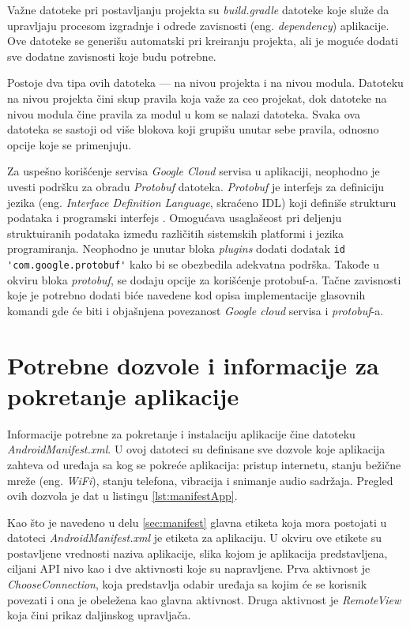 \documentclass[implementacija.tex]{subfiles}
\begin{document}
Važne datoteke pri postavljanju projekta su \textit{build.gradle} datoteke koje služe da  upravljaju procesom izgradnje i odrede zavisnosti (eng. \textit{dependency}) aplikacije. Ove datoteke se generišu automatski pri kreiranju projekta, ali je moguće dodati sve dodatne zavisnosti koje budu potrebne.

Postoje dva tipa ovih datoteka --- na nivou projekta i na nivou modula. Datoteku na nivou projekta čini skup pravila koja važe za ceo projekat, dok datoteke na nivou modula čine pravila za modul u kom se nalazi datoteka. Svaka ova datoteka se sastoji od više blokova koji grupišu unutar sebe pravila, odnosno opcije koje se primenjuju.

Za uspešno korišćenje servisa \textit{Google Cloud} servisa u aplikaciji, neophodno je uvesti podršku za obradu \textit{Protobuf} datoteka. \textit{Protobuf} je interfejs za definiciju jezika (eng. \textit{Interface Definition Language}, skraćeno IDL) koji definiše strukturu podataka i programski interfejs \cite{sajt:protobuf}. Omogućava usaglašeost pri deljenju struktuiranih podataka između različitih sistemskih platformi i jezika programiranja. Neophodno je unutar bloka \textit{plugins} dodati dodatak \verb|id 'com.google.protobuf'| kako bi se obezbedila adekvatna podrška. Takođe u okviru bloka \textit{protobuf}, se dodaju opcije za korišćenje protobuf-a. Tačne zavisnosti koje je potrebno dodati biće navedene kod opisa implementacije glasovnih komandi gde će biti i objašnjena povezanost \textit{Google cloud} servisa i \textit{protobuf}-a.

\section{Potrebne dozvole i informacije za pokretanje aplikacije}

Informacije potrebne za pokretanje i instalaciju aplikacije čine datoteku \textit{AndroidManifest.xml}. U ovoj datoteci su definisane sve dozvole koje aplikacija zahteva od uređaja sa kog se pokreće aplikacija: pristup internetu, stanju bežične mreže (eng. \textit{WiFi}), stanju telefona, vibracija i  snimanje audio sadržaja. Pregled ovih dozvola je dat u listingu \ref{lst:manifestApp}.

Kao što je navedeno u delu \ref{sec:manifest} glavna etiketa koja mora postojati u datoteci \textit{AndroidManifest.xml} je etiketa za aplikaciju. U okviru ove etikete su postavljene vrednosti naziva aplikacije, slika kojom je aplikacija predstavljena, ciljani API nivo kao i dve aktivnosti koje su napravljene. Prva aktivnost je \textit{ChooseConnection}, koja predstavlja odabir uređaja sa kojim će se korisnik povezati i ona je obeležena kao glavna aktivnost. Druga aktivnost je \textit{RemoteView} koja čini prikaz daljinskog upravljača. 
\end{document}
